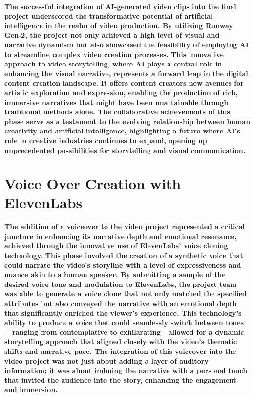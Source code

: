 \documentclass[11pt,a4paper,oneside]{report}
\begin{document}
\paragraph{The successful integration of AI-generated video clips into the final project underscored the transformative potential of artificial intelligence in the realm of video production. By utilizing Runway Gen-2, the project not only achieved a high level of visual and narrative dynamism but also showcased the feasibility of employing AI to streamline complex video creation processes. This innovative approach to video storytelling, where AI plays a central role in enhancing the visual narrative, represents a forward leap in the digital content creation landscape. It offers content creators new avenues for artistic exploration and expression, enabling the production of rich, immersive narratives that might have been unattainable through traditional methods alone. The collaborative achievements of this phase serve as a testament to the evolving relationship between human creativity and artificial intelligence, highlighting a future where AI's role in creative industries continues to expand, opening up unprecedented possibilities for storytelling and visual communication.}

\section{Voice Over Creation with ElevenLabs}

\paragraph{The addition of a voiceover to the video project represented a critical juncture in enhancing its narrative depth and emotional resonance, achieved through the innovative use of ElevenLabs' voice cloning technology. This phase involved the creation of a synthetic voice that could narrate the video's storyline with a level of expressiveness and nuance akin to a human speaker. By submitting a sample of the desired voice tone and modulation to ElevenLabs, the project team was able to generate a voice clone that not only matched the specified attributes but also conveyed the narrative with an emotional depth that significantly enriched the viewer's experience. This technology's ability to produce a voice that could seamlessly switch between tones—ranging from contemplative to exhilarating—allowed for a dynamic storytelling approach that aligned closely with the video's thematic shifts and narrative pace. The integration of this voiceover into the video project was not just about adding a layer of auditory information; it was about imbuing the narrative with a personal touch that invited the audience into the story, enhancing the engagement and immersion.}
\end{document}
